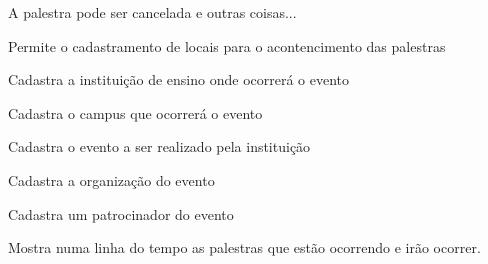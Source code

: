 \documentclass[12pt,a4paper]{article}
\begin{document}
        	{A palestra pode ser cancelada e outras coisas...}
        	{%
        	
        	}
			
        	{Permite o cadastramento de locais para o acontencimento das palestras}
        	{%
        	
        	}
			
        	{Cadastra a instituição de ensino onde ocorrerá o evento}
        	{%
        	
        	}
					
			
        	{Cadastra o campus que ocorrerá o evento}
        	{%
        	
        	}
			
        	{Cadastra o evento a ser realizado pela instituição }
        	{%
        	
        	}
			
        	{Cadastra a organização do evento}
        	{%
        	
        	}
			
        	{Cadastra um patrocinador do evento}
        	{%
        	
        	}
			
        	{}
        	{%
        	
        	}
			
        	{}
        	{%
        	
        	}
			
        	{}
        	{%
        	
        	}
			
        	{}
        	{%
        	
        	}
			
        	{Mostra numa linha do tempo as palestras que estão ocorrendo e irão ocorrer.}
        	{%
        	
        	}
			
\end{document}
